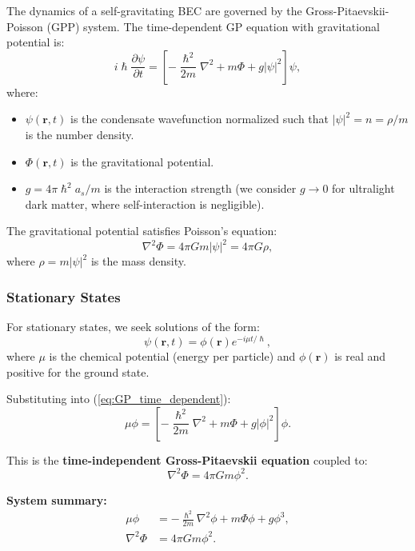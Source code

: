 \documentclass[11pt,a4paper]{article}
\newcommand{\hbar}{\ensuremath{\hslash}}
\theoremstyle{definition}
\theoremstyle{remark}
\begin{document}
The dynamics of a self-gravitating BEC are governed by the Gross-Pitaevskii-Poisson (GPP) system. The time-dependent GP equation with gravitational potential is:
\begin{equation}
\label{eq:GP_time_dependent}
i\hbar \frac{\partial \psi}{\partial t} = \left[-\frac{\hbar^2}{2m}\nabla^2 + m\Phi + g|\psi|^2\right]\psi,
\end{equation}
where:
\begin{itemize}
    \item $\psi(\mathbf{r},t)$ is the condensate wavefunction normalized such that $|\psi|^2 = n = \rho/m$ is the number density.
    \item $\Phi(\mathbf{r},t)$ is the gravitational potential.
    \item $g = 4\pi\hbar^2 a_s/m$ is the interaction strength (we consider $g \to 0$ for ultralight dark matter, where self-interaction is negligible).
\end{itemize}

The gravitational potential satisfies Poisson's equation:
\begin{equation}
\label{eq:Poisson}
\nabla^2\Phi = 4\pi G m|\psi|^2 = 4\pi G \rho,
\end{equation}
where $\rho = m|\psi|^2$ is the mass density.

\subsubsection{Stationary States}

For stationary states, we seek solutions of the form:
\begin{equation}
\psi(\mathbf{r},t) = \phi(\mathbf{r})e^{-i\mu t/\hbar},
\end{equation}
where $\mu$ is the chemical potential (energy per particle) and $\phi(\mathbf{r})$ is real and positive for the ground state.

Substituting into (\ref{eq:GP_time_dependent}):
\begin{equation}
\label{eq:GP_stationary}
\boxed{\mu\phi = \left[-\frac{\hbar^2}{2m}\nabla^2 + m\Phi + g|\phi|^2\right]\phi.}
\end{equation}

This is the \textbf{time-independent Gross-Pitaevskii equation} coupled to:
\begin{equation}
\label{eq:Poisson_stationary}
\boxed{\nabla^2\Phi = 4\pi G m\phi^2.}
\end{equation}

\textbf{System summary:}
\begin{align}
\mu\phi &= -\frac{\hbar^2}{2m}\nabla^2\phi + m\Phi\phi + g\phi^3, \label{eq:GPP_1}\\
\nabla^2\Phi &= 4\pi G m\phi^2. \label{eq:GPP_2}
\end{align}
\end{document}
